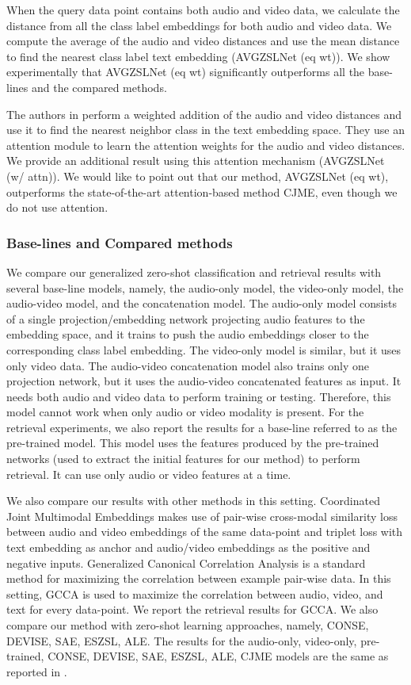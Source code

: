 \documentclass[10pt,twocolumn,letterpaper]{article}
\begin{document}
When the query data point contains both audio and video data, we calculate the distance from all the class label embeddings for both audio and video data. We compute the average of the audio and video distances and use the mean distance to find the nearest class label text embedding (AVGZSLNet (eq wt)). We show experimentally that AVGZSLNet (eq wt) significantly outperforms all the base-lines and the compared methods.  

The authors in \cite{parida2020coordinated} perform a weighted addition of the audio and video distances and use it to find the nearest neighbor class in the text embedding space. They use an attention module to learn the attention weights for the audio and video distances. We provide an additional result using this attention mechanism (AVGZSLNet (w/ attn)). We would like to point out that our method, AVGZSLNet (eq wt), outperforms the state-of-the-art attention-based method CJME, even though we do not use attention.

\subsubsection{Base-lines and Compared methods}
We compare our generalized zero-shot classification and retrieval results with several base-line models, namely, the audio-only model, the video-only model, the audio-video model,  and the concatenation model. The audio-only model consists of a single projection/embedding network projecting audio features to the embedding space, and it trains to push the audio embeddings closer to the corresponding class label embedding. The video-only model is similar, but it uses only video data. The audio-video concatenation model also trains only one projection network, but it uses the audio-video concatenated features as input. It needs both audio and video data to perform training or testing. Therefore, this model cannot work when only audio or video modality is present. For the retrieval experiments, we also report the results for a base-line referred to as the pre-trained model. This model uses the features produced by the pre-trained networks (used to extract the initial features for our method) to perform retrieval. It can use only audio or video features at a time.


We also compare our results with other methods in this setting. Coordinated Joint Multimodal Embeddings \cite{parida2020coordinated} makes use of pair-wise cross-modal similarity loss between audio and video embeddings of the same data-point and triplet loss with text embedding as anchor and audio/video embeddings as the positive and negative inputs. Generalized Canonical Correlation Analysis \cite{kettenring1971canonical} is a standard method for maximizing the correlation between example pair-wise data. In this setting, GCCA is used to maximize the correlation between audio, video, and text for every data-point. We report the retrieval results for GCCA. We also compare our method with zero-shot learning approaches, namely, CONSE, DEVISE, SAE, ESZSL, ALE. The results for the audio-only, video-only, pre-trained, CONSE, DEVISE, SAE, ESZSL, ALE, CJME models are the same as reported in \cite{parida2020coordinated}. 
\end{document}
